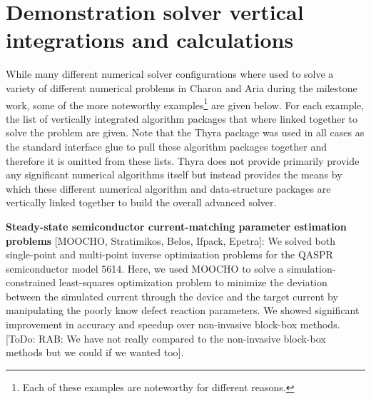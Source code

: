 \documentclass[pdf,ps2pdf,11pt]{SANDreport}
\begin{document}

%
\section{Demonstration solver vertical integrations and calculations}
\label{sec:demonstration}
%

While many different numerical solver configurations where used to solve a
variety of different numerical problems in Charon and Aria during the
milestone work, some of the more noteworthy examples\footnote{Each of these
examples are noteworthy for different reasons.} are given below.  For each
example, the list of vertically integrated algorithm packages that where
linked together to solve the problem are given.  Note that the Thyra package
was used in all cases as the standard interface glue to pull these algorithm
packages together and therefore it is omitted from these lists.  Thyra does
not provide primarily provide any significant numerical algorithms itself but
instead provides the means by which these different numerical algorithm and
data-structure packages are vertically linked together to build the overall
advanced solver.


{}\noindent\textbf{Steady-state semiconductor current-matching parameter
estimation problems} [MOOCHO, Stratimikos, Belos, Ifpack, Epetra]: We
solved both single-point and multi-point inverse optimization problems for the
QASPR semiconductor model 5614.  Here, we used MOOCHO to solve a
simulation-constrained least-squares optimization problem to minimize the
deviation between the simulated current through the device and the target
current by manipulating the poorly know defect reaction parameters.  We showed
significant improvement in accuracy and speedup over non-invasive block-box
methods. [ToDo: RAB: We have not really compared to the non-invasive block-box
methods but we could if we wanted too].


\end{document}
